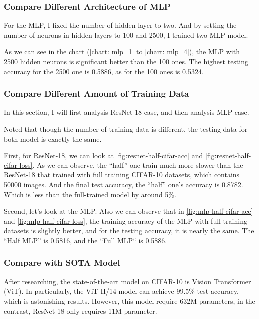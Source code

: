 \documentclass[twocolumn, draft]{extarticle}
\begin{document}
\subsubsection{Compare Different Architecture of MLP}

For the MLP, I fixed the number of hidden layer to two. And by setting the number of neurons in hidden layers to 100 and 2500, I trained two MLP model.

As we can see in the chart (\autoref{chart: mlp_1} to \autoref{chart: mlp_4}), the MLP with 2500 hidden neurons is significant better than the 100 ones. The highest testing accuracy for the 2500 one is 0.5886, as for the 100 ones is 0.5324.

\subsubsection{Compare Different Amount of Training Data}

In this section, I will first analysis ResNet-18 case, and then analysis MLP case. 

Noted that though the number of training data is different, the testing data for both model is exactly the same.

First, for ResNet-18, we can look at \autoref{fig:resnet-half-cifar-acc} and \autoref{fig:resnet-half-cifar-loss}. As we can observe, the ``half'' one train much more slower than the ResNet-18 that trained with full training CIFAR-10 datasets, which contains 50000 images. And the final test accuracy, the ``half'' one's accuracy is 0.8782. Which is less than the full-trained model by around 5\%.

Second, let's look at the MLP. Also we can observe that in \autoref{fig:mlp-half-cifar-acc} and \autoref{fig:mlp-half-cifar-loss}, the training accuracy of the MLP with full training datasets is slightly better, and for the testing accuracy, it is nearly the same. The ``Half MLP'' is 0.5816, and the ``Full MLP`` is 0.5886.

\subsubsection{Compare with SOTA Model}

After researching, the state-of-the-art model on CIFAR-10 is Vision Transformer (ViT). In particularly, the ViT-H/14 model can achieve 99.5\% test accuracy, which is astonishing results. However, this model require 632M parameters, in the contrast, ResNet-18 only requires 11M parameter.
\end{document}
